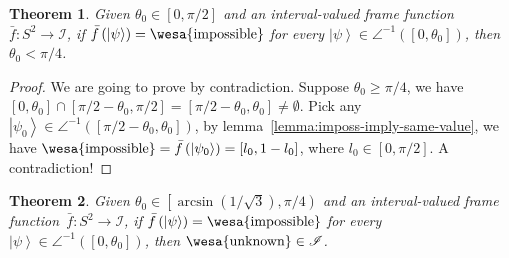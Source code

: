 \documentclass[12pt]{iopart}
\theoremstyle{plain}
\newtheorem{thm}{Theorem}
\theoremstyle{definition}
\newcommand{\imposs}{{\mbox{\wesa{impossible}}}}
\newcommand{\unknown}{{\mbox{\wesa{unknown}}}}
\newcommand{\ket}[1]{{\left\vert{#1}\right\rangle}}
\begin{document}
\begin{thm}\label{thm:pi-div-4}Given $\theta_{0}\in\left[0,\pi / 2\right]$
and an interval-valued frame function~$\bar{f}:S^{2}\rightarrow\mathscr{I}$,
if $\bar{f}\left(\ket{\psi}\right)=\imposs$ for every $\ket{\psi}\in\angle^{-1}\left(\left[0,\theta_{0}\right]\right)$,
then $\theta_{0}<\pi / 4$.\end{thm}
\begin{proof}
We are going to prove by contradiction. Suppose $\theta_{0}\ge\pi / 4$,
we have $\left[0,\theta_{0}\right]\cap\left[\pi / 2-\theta_{0},\pi / 2\right]=\left[\pi / 2-\theta_{0},\theta_{0}\right]\ne\emptyset$.
Pick any $\ket{\psi_{0}}\in\angle^{-1}\left(\left[\pi / 2-\theta_{0},\theta_{0}\right]\right)$,
by lemma~\ref{lemma:imposs-imply-same-value}, we have $\imposs=\bar{f}\left(\ket{\psi_{0}}\right)=\left[l_{0},1-l_{0}\right]$,
where $l_{0}\in\left[0,\pi / 2\right]$. A contradiction!
\end{proof}
\begin{thm}\label{thm:arcsin-one-over-sqrt-three}Given $\theta_{0}\in\left[\arcsin\left(1 / \sqrt{3}\right),\pi / 4\right)$
and an interval-valued frame function~$\bar{f}:S^{2}\rightarrow\mathscr{I}$,
if $\bar{f}\left(\ket{\psi}\right)=\imposs$ for every $\ket{\psi}\in\angle^{-1}\left(\left[0,\theta_{0}\right]\right)$,
then $\unknown\in\mathscr{I}$.\end{thm}
\end{document}
